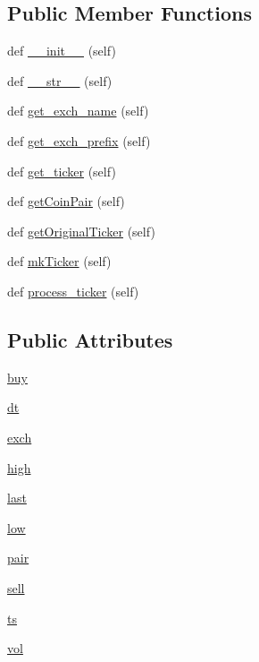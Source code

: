 \subsection*{Public Member Functions}
\begin{DoxyCompactItemize}
\item 
def \hyperlink{classexchange_1_1_bitfinex_a8c78d78f5cd885555b7a90060715d357}{\+\_\+\+\_\+init\+\_\+\+\_\+} (self)
\item 
def \hyperlink{classexchange_1_1_bitfinex_aef5d2ae00f1574b1258ea73c851a70a8}{\+\_\+\+\_\+str\+\_\+\+\_\+} (self)
\item 
def \hyperlink{classexchange_1_1_bitfinex_ae1904e7c72516db02ed1c72cd18f8cdc}{get\+\_\+exch\+\_\+name} (self)
\item 
def \hyperlink{classexchange_1_1_bitfinex_a99f65e8aad1c14b80bbb1765f33640c8}{get\+\_\+exch\+\_\+prefix} (self)
\item 
def \hyperlink{classexchange_1_1_bitfinex_a1d74178897b4ac36c8ed6b4523f539f5}{get\+\_\+ticker} (self)
\item 
def \hyperlink{classexchange_1_1_bitfinex_a698ecb1924ae0f0a97613c3f49463729}{get\+Coin\+Pair} (self)
\item 
def \hyperlink{classexchange_1_1_bitfinex_a7853d59743dd4029bb218e60604dec88}{get\+Original\+Ticker} (self)
\item 
def \hyperlink{classexchange_1_1_bitfinex_a787c17ddae2b4f5022fc12bc2a0c0a2b}{mk\+Ticker} (self)
\item 
def \hyperlink{classexchange_1_1_bitfinex_a8e6513876891b917f246507f37d7e179}{process\+\_\+ticker} (self)
\end{DoxyCompactItemize}
\subsection*{Public Attributes}
\begin{DoxyCompactItemize}
\item 
\hyperlink{classexchange_1_1_bitfinex_aed7ff0d2287aaf4d61985d6f11c23c98}{buy}
\item 
\hyperlink{classexchange_1_1_bitfinex_adc9e5a19056dcc22e8028e749b233795}{dt}
\item 
\hyperlink{classexchange_1_1_bitfinex_af5865e2fa72ee1706254ba963bfa10e9}{exch}
\item 
\hyperlink{classexchange_1_1_bitfinex_a1380a7a7a3438e47785f10f68b0d61b9}{high}
\item 
\hyperlink{classexchange_1_1_bitfinex_a56e491a27f4b3215b66e13da7796c078}{last}
\item 
\hyperlink{classexchange_1_1_bitfinex_a7d4241119b1fa3860743647a0c6c3416}{low}
\item 
\hyperlink{classexchange_1_1_bitfinex_a901a5499667f1f2b391bc9dbbfe1c1c7}{pair}
\item 
\hyperlink{classexchange_1_1_bitfinex_a9aebaf447f73e582f7bc626e526e0201}{sell}
\item 
\hyperlink{classexchange_1_1_bitfinex_abf872e8ea738acd33d34a00d9d9e92c4}{ts}
\item 
\hyperlink{classexchange_1_1_bitfinex_a278da3a9eab93e256041c988f9bbd54c}{vol}
\end{DoxyCompactItemize}
